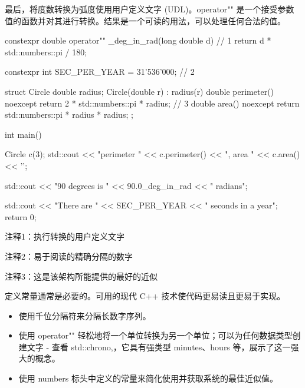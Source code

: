 最后，将度数转换为弧度使用用户定义文字 (UDL)。operator"" 是一个接受参数值的函数并对其进行转换。结果是一个可读的用法，可以处理任何合法的值。


\begin{cpp}
constexpr double operator"" _deg_in_rad(long double d) { // 1
  return d * std::numbers::pi / 180;
}

constexpr int SEC_PER_YEAR = 31'536'000; // 2

struct Circle {
  double radius;
  Circle(double r) : radius(r) {}
  double perimeter() noexcept { return 2 *
  std::numbers::pi * radius; } // 3
  double area() noexcept { return std::numbers::pi * radius * radius; }
};

int main() {
  Circle c(3);
  std::cout << "perimeter " << c.perimeter() << ", area " << c.area()
    << '\n';

  std::cout << "90 degrees is " << 90.0_deg_in_rad << " radians\n";

  std::cout << "There are " << SEC_PER_YEAR << " seconds in a year\n";
  return 0;
}
\end{cpp}

{\footnotesize
注释1：执行转换的用户定义文字

注释2：易于阅读的精确分隔的数字

注释3：这是该架构所能提供的最好的近似
}

定义常量通常是必要的。可用的现代 C++ 技术使代码更易读且更易于实现。


\begin{itemize}
\item
使用千位分隔符来分隔长数字序列。

\item
使用 operator"" 轻松地将一个单位转换为另一个单位；可以为任何数据类型创建文字 - 查看 std::chrono,，它具有强类型 minutes、hours 等，展示了这一强大的概念。

\item
使用 numbers 标头中定义的常量来简化使用并获取系统的最佳近似值。
\end{itemize}
